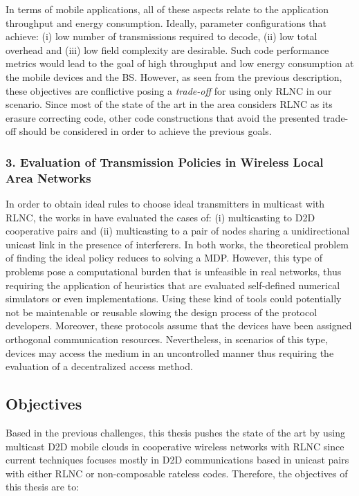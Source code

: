 In terms of mobile applications, all of these aspects relate to the application throughput and energy consumption. Ideally, parameter configurations that achieve: (i) low number of transmissions required to decode, (ii) low total overhead and (iii) low field complexity are desirable. Such code performance metrics would lead to the goal of high throughput and low energy consumption at the mobile devices and the \ac{BS}. However, as seen from the previous description, these objectives are conflictive posing a \textit{trade-off} for using only \ac{RLNC} in our scenario. Since most of the state of the art in the area considers \ac{RLNC} as its erasure correcting code, other code constructions that avoid the presented trade-off should be considered in order to achieve the previous goals.

\subsubsection{3. Evaluation of Transmission Policies in Wireless Local Area Networks}
In order to obtain ideal rules to choose ideal transmitters in multicast with \ac{RLNC}, the works in \cite{khamfroush2013minimizing,khamfroush2015optimal,khamfroush2014coded} have evaluated the cases of: (i) multicasting to \ac{D2D} cooperative pairs and (ii) multicasting to a pair of nodes sharing a unidirectional unicast link in the presence of interferers. In both works, the theoretical problem of finding the ideal policy reduces to solving a \ac{MDP}. However, this type of problems pose a computational burden that is unfeasible in real networks, thus requiring the application of heuristics that are evaluated self-defined numerical simulators or even implementations. Using these kind of tools could potentially not be maintenable or reusable slowing the design process of the protocol developers. Moreover, these protocols assume that the devices have been assigned orthogonal communication resources. Nevertheless, in scenarios of this type, devices may access the medium in an uncontrolled manner thus requiring the evaluation of a decentralized access method.

\subsection{Objectives}
Based in the previous challenges, this thesis pushes the state of the art by using multicast \ac{D2D} mobile clouds in cooperative wireless networks with \ac{RLNC} since current techniques focuses mostly in \ac{D2D} communications based in unicast pairs with either \ac{RLNC} or non-composable rateless codes. Therefore, the objectives of this thesis are to:

